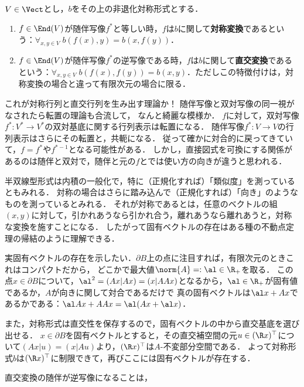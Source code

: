 \documentclass[uplatex, dvipdfmx]{jsreport}
\begin{document}
\begin{definition}
    $V\in\Vect$とし，$b$をその上の非退化対称形式とする．
    \begin{enumerate}
        \item $f\in\End(V)$が随伴写像$f^*$と等しい時，$f$は$b$に関して\textbf{対称変換}であるという：$\forall_{x,y\in V}\;b(f(x),y)=b(x,f(y))$．
        \item $f\in\End(V)$が随伴写像$f^*$の逆写像である時，$f$は$b$に関して\textbf{直交変換}であるという：$\forall_{x,y\in V}\;b(f(x),f(y))=b(x,y)$．ただしこの特徴付けは，対称変換の場合と違って有限次元の場合に限る．
    \end{enumerate}
\end{definition}
\begin{remark}
    これが対称行列と直交行列を生み出す理論か！
    随伴写像と双対写像の同一視がなされたら転置の理論も合流して，
    なんと綺麗な模様か．
    $f$に対して，双対写像$f^*:V^*\to V^*$の双対基底に関する行列表示は転置になる．
    随伴写像$f^*:V\to V$の行列表示はさらにその転置と，共軛になる．
    従って確かに対合的に戻ってきていて，$f=f^*$や$f^{*-1}$となる可能性がある．
    しかし，直接図式を可換にする関係があるのは随伴と双対で，随伴と元の$f$とでは使い方の向きが違うと思われる．
\end{remark}
\begin{remarks}
    半双線型形式は内積の一般化で，特に（正規化すれば）「類似度」を測っているともみれる．
    対称の場合はさらに踏み込んで（正規化すれば）「向き」のようなものを測っているとみれる．
    それが対称であるとは，任意のベクトルの組$(x,y)$に対して，引かれあうなら引かれ合う，離れあうなら離れあうと，対称な変換を施すことになる．
    したがって固有ベクトルの存在はある種の不動点定理の帰結のように理解できる．

    実固有ベクトルの存在を示したい．$\partial B$上の点に注目すれば，有限次元のときこれはコンパクトだから，
    どこかで最大値$\norm{A}=:\al\in\R_+$を取る．
    この点$x\in\partial B$について，$\al^2=(Ax|Ax)=(x|AAx)$となるから，$\al\in\R_+$が固有値であるか，$A$が向きに関して対合であるだけで
    真の固有ベクトルは$\al x+Ax$であるかである：$\al Ax+AAx=\al(Ax+\al x)$．

    また，対称形式は直交性を保存するので，固有ベクトルの中から直交基底を選び出せる．
    $x\in\partial B$を固有ベクトルとすると，その直交補空間の元$u\in (\R x)^\top$について$(Ax|u)=(x|Au)$より，$(\R x)^\top$は$A$-不変部分空間である．
    よって対称形式$b$は$(\R x)^\top$に制限できて，再びここには固有ベクトルが存在する．

    直交変換の随伴が逆写像になることは，
\end{remarks}
\end{document}
